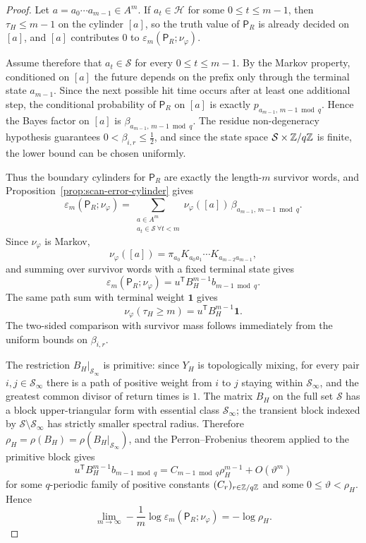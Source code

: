 \begin{proof}
Let \(a=a_0\cdots a_{m-1}\in A^m\).  If \(a_t\in\mathcal H\) for some
\(0\leq t\leq m-1\), then \(\tau_H\leq m-1\) on the cylinder \([a]\), so
the truth value of \(\mathsf{P}_R\) is already decided on \([a]\), and
\([a]\) contributes \(0\) to
\(\varepsilon_m(\mathsf{P}_R;\nu_\varphi)\).

Assume therefore that \(a_t\in\mathcal S\) for every
\(0\leq t\leq m-1\).  By the Markov property, conditioned on \([a]\) the
future depends on the prefix only through the terminal state
\(a_{m-1}\).  Since the next possible hit time occurs after at least one
additional step, the conditional probability of \(\mathsf{P}_R\) on
\([a]\) is exactly \(p_{a_{m-1},\,m-1\bmod q}\).  Hence the Bayes factor
on \([a]\) is \(\beta_{a_{m-1},\,m-1\bmod q}\).  The residue
non-degeneracy hypothesis guarantees \(0<\beta_{i,r}\leq \tfrac12\), and
since the state space \(\mathcal S\times \mathbb{Z}/q\mathbb{Z}\) is finite, the lower
bound can be chosen uniformly.

Thus the boundary cylinders for \(\mathsf{P}_R\) are exactly the
length-\(m\) survivor words, and
Proposition~\ref{prop:scan-error-cylinder} gives
\[
  \varepsilon_m(\mathsf{P}_R;\nu_\varphi)
  = \sum_{\substack{a\in A^m\\ a_t\in\mathcal S\ \forall t<m}}
      \nu_\varphi([a])\,
      \beta_{a_{m-1},\,m-1\bmod q}.
\]
Since \(\nu_\varphi\) is Markov,
\[
  \nu_\varphi([a])
  = \pi_{a_0}K_{a_0a_1}\cdots K_{a_{m-2}a_{m-1}},
\]
and summing over survivor words with a fixed terminal state gives
\[
  \varepsilon_m(\mathsf{P}_R;\nu_\varphi)
  = u^{\mathsf T}B_H^{m-1}b_{m-1\bmod q}.
\]
The same path sum with terminal weight \(\mathbf{1}\) gives
\[
  \nu_\varphi(\tau_H\geq m)
  = u^{\mathsf T}B_H^{m-1}\mathbf{1}.
\]
The two-sided comparison with survivor mass follows immediately from the
uniform bounds on \(\beta_{i,r}\).

The restriction \(B_H|_{\mathcal S_\infty}\) is primitive: since
\(Y_H\) is topologically mixing, for every pair
\(i,j\in\mathcal S_\infty\) there is a path of positive weight from
\(i\) to \(j\) staying within \(\mathcal S_\infty\), and the greatest
common divisor of return times is \(1\).  The matrix \(B_H\) on the
full set \(\mathcal S\) has a block upper-triangular form with
essential class \(\mathcal S_\infty\); the transient block indexed by
\(\mathcal S\setminus\mathcal S_\infty\) has strictly smaller spectral
radius.  Therefore
\(\rho_H=\rho(B_H)=\rho(B_H|_{\mathcal S_\infty})\), and the
Perron--Frobenius theorem applied to the primitive block gives
\[
  u^{\mathsf T}B_H^{m-1}b_{m-1\bmod q}
  = C_{m-1\bmod q}\rho_H^{m-1}+O(\vartheta^m)
\]
for some \(q\)-periodic family of positive constants
\((C_r)_{r\in\mathbb{Z}/q\mathbb{Z}}\) and some \(0\leq \vartheta<\rho_H\).  Hence
\[
  \lim_{m\to\infty}
  -\frac1m\log\varepsilon_m(\mathsf{P}_R;\nu_\varphi)
  = -\log\rho_H.
\]


\end{proof}
